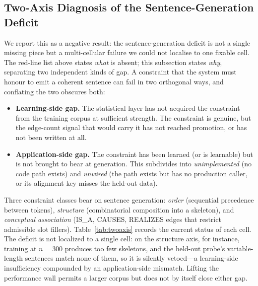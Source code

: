 \documentclass[11pt,a4paper]{article}
\begin{document}
\subsection{Two-Axis Diagnosis of the Sentence-Generation Deficit}
\label{sec:lim-twoaxis}

We report this as a negative result: the sentence-generation deficit is
not a single missing piece but a multi-cellular failure we could not
localise to one fixable cell. The red-line list above states \emph{what}
is absent; this subsection states \emph{why}, separating two independent
kinds of gap. A constraint that the system must honour to emit a coherent
sentence can fail in two orthogonal ways, and conflating the two obscures
both:

\begin{itemize}[leftmargin=*]
\item \textbf{Learning-side gap.} The statistical layer has not acquired
the constraint from the training corpus at sufficient strength. The
constraint is genuine, but the edge-count signal that would carry it has
not reached promotion, or has not been written at all.
\item \textbf{Application-side gap.} The constraint has been learned (or
is learnable) but is not brought to bear at generation. This subdivides
into \emph{unimplemented} (no code path exists) and \emph{unwired} (the
path exists but has no production caller, or its alignment key misses the
held-out data).
\end{itemize}

Three constraint classes bear on sentence generation: \emph{order}
(sequential precedence between tokens), \emph{structure} (combinatorial
composition into a skeleton), and \emph{conceptual association} (IS\_A,
CAUSES, REALIZES edges that restrict admissible slot fillers).
Table~\ref{tab:twoaxis} records the current status of each cell. The
deficit is not localized to a single cell: on the structure axis, for
instance, training at $n=300$ produces too few skeletons, and the
held-out probe's variable-length sentences match none of them, so it is
silently vetoed---a learning-side insufficiency compounded by an
application-side mismatch. Lifting the performance wall permits a larger
corpus but does not by itself close either gap.
\end{document}
